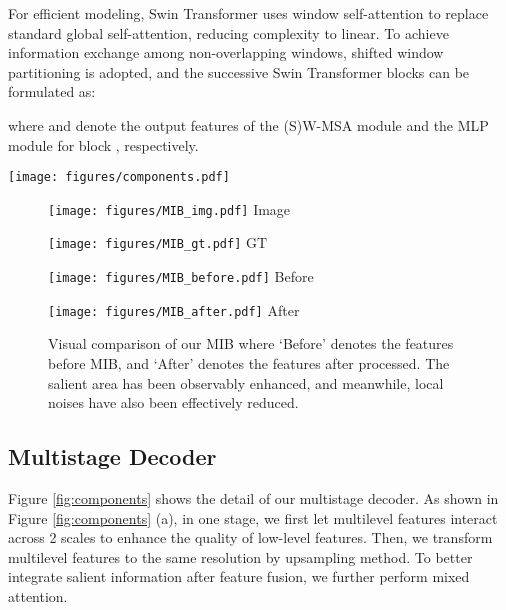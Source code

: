 \documentclass[lettersize,journal]{IEEEtran}
\begin{document}
For efficient modeling, Swin Transformer uses window self-attention to replace standard global self-attention, reducing complexity to linear. To achieve information exchange among non-overlapping windows, shifted window partitioning is adopted, and the successive Swin Transformer blocks can be formulated as:

where  and  denote the output features of the (S)W-MSA module and the MLP module for block , respectively. 
\begin{figure*}[t]
	\centering \texttt{[image: figures/components.pdf]}
	\caption{Details of our multistage decoder. (a) denotes one stage of the decoder, (b) denotes the structure of cross-attention, and (c) denotes the structure of the Mixed Attention Block.  denotes the number of MAB stacked and we set it to 2.  can be from  or . }
	\label{fig:components}
\end{figure*}
\begin{figure}[t]
	\centering \begin{minipage}[t]{0.11\textwidth}
		\centering
		\texttt{[image: figures/MIB\_img.pdf]}
		\centering\footnotesize{Image}
	\end{minipage}
	\begin{minipage}[t]{0.11\textwidth}
		\centering
		\texttt{[image: figures/MIB\_gt.pdf]}
		\centering\footnotesize{GT}
	\end{minipage}
	\begin{minipage}[t]{0.11\textwidth}
		\centering
		\texttt{[image: figures/MIB\_before.pdf]}
		\centering\footnotesize{Before}
	\end{minipage}
	\begin{minipage}[t]{0.11\textwidth}
		\centering
		\texttt{[image: figures/MIB\_after.pdf]}
		\centering\footnotesize{After}
	\end{minipage}
	\begin{minipage}[t]{0.1\textwidth}\end{minipage}
	
	\par\;\caption{Visual comparison of our MIB where `Before' denotes the features before MIB, and `After' denotes the features after processed. The salient area has been observably enhanced, and meanwhile, local noises have also been effectively reduced.}
	\label{fig:MIB}
\end{figure}


\subsection{Multistage Decoder}
Figure \ref{fig:components} shows the detail of our multistage decoder. As shown in Figure \ref{fig:components} (a), in one stage, we first let multilevel features interact across 2 scales to enhance the quality of low-level features. Then, we transform multilevel features to the same resolution by upsampling method. To better integrate salient information after feature fusion, we further perform mixed attention. 
\end{document}
